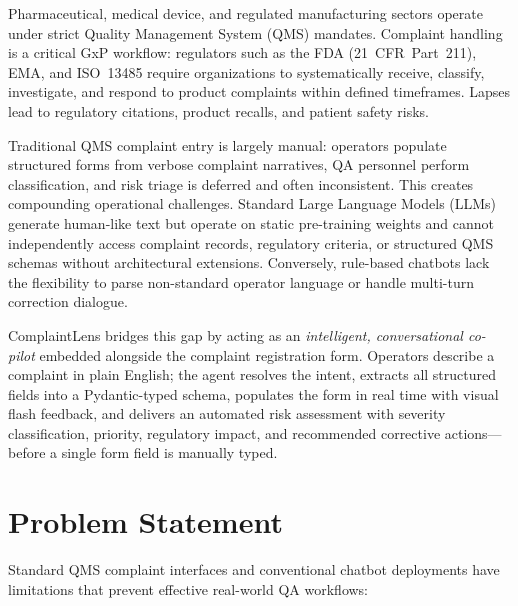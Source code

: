 \documentclass[12pt,a4paper]{report}
\begin{document}
Pharmaceutical, medical device, and regulated manufacturing sectors operate under strict Quality Management System (QMS) mandates. Complaint handling is a critical GxP workflow: regulators such as the FDA (21~CFR~Part~211), EMA, and ISO~13485 require organizations to systematically receive, classify, investigate, and respond to product complaints within defined timeframes. Lapses lead to regulatory citations, product recalls, and patient safety risks.

Traditional QMS complaint entry is largely manual: operators populate structured forms from verbose complaint narratives, QA personnel perform classification, and risk triage is deferred and often inconsistent. This creates compounding operational challenges. Standard Large Language Models (LLMs) generate human-like text but operate on static pre-training weights and cannot independently access complaint records, regulatory criteria, or structured QMS schemas without architectural extensions. Conversely, rule-based chatbots lack the flexibility to parse non-standard operator language or handle multi-turn correction dialogue.

ComplaintLens bridges this gap by acting as an \textit{intelligent, conversational co-pilot} embedded alongside the complaint registration form. Operators describe a complaint in plain English; the agent resolves the intent, extracts all structured fields into a Pydantic-typed schema, populates the form in real time with visual flash feedback, and delivers an automated risk assessment with severity classification, priority, regulatory impact, and recommended corrective actions---before a single form field is manually typed.

\section{Problem Statement}

Standard QMS complaint interfaces and conventional chatbot deployments have limitations that prevent effective real-world QA workflows:
\end{document}
